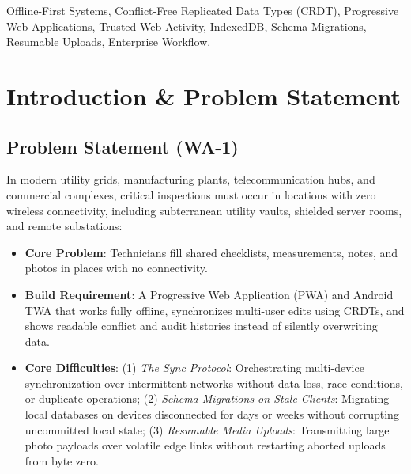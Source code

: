 \documentclass[conference]{IEEEtran}
\begin{document}
\begin{IEEEkeywords}
Offline-First Systems, Conflict-Free Replicated Data Types (CRDT), Progressive Web Applications, Trusted Web Activity, IndexedDB, Schema Migrations, Resumable Uploads, Enterprise Workflow.
\end{IEEEkeywords}

\section{Introduction \& Problem Statement}

\subsection{Problem Statement (WA-1)}
In modern utility grids, manufacturing plants, telecommunication hubs, and commercial complexes, critical inspections must occur in locations with zero wireless connectivity, including subterranean utility vaults, shielded server rooms, and remote substations:
\begin{itemize}\setlength{\itemsep}{1pt}
    \item \textbf{Core Problem}: Technicians fill shared checklists, measurements, notes, and photos in places with no connectivity.
    \item \textbf{Build Requirement}: A Progressive Web Application (PWA) and Android TWA that works fully offline, synchronizes multi-user edits using CRDTs, and shows readable conflict and audit histories instead of silently overwriting data.
    \item \textbf{Core Difficulties}: 
    (1) \textit{The Sync Protocol}: Orchestrating multi-device synchronization over intermittent networks without data loss, race conditions, or duplicate operations;
    (2) \textit{Schema Migrations on Stale Clients}: Migrating local databases on devices disconnected for days or weeks without corrupting uncommitted local state;
    (3) \textit{Resumable Media Uploads}: Transmitting large photo payloads over volatile edge links without restarting aborted uploads from byte zero.
\end{itemize}
\end{document}
